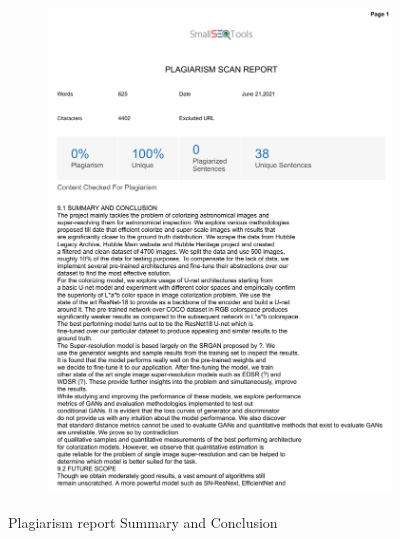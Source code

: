 \documentclass[oneside,a4paper,12pt]{report}
\begin{document}
\begin{appendices}
\begin{figure}
	\begin{subfigure}[H]{\textwidth}
		\centering
    	\includegraphics[scale=0.7, page=1]{plagiarism/summary_conclusion.pdf}
    \end{subfigure}
 \caption{Plagiarism report Summary and Conclusion}
    \label{PlagiarismSummary}
\end{figure}
\begin{figure}\ContinuedFloat
    \begin{subfigure}[H]{\textwidth}
    	\centering

\end{subfigure}
\end{figure}
\end{appendices}
\end{document}
